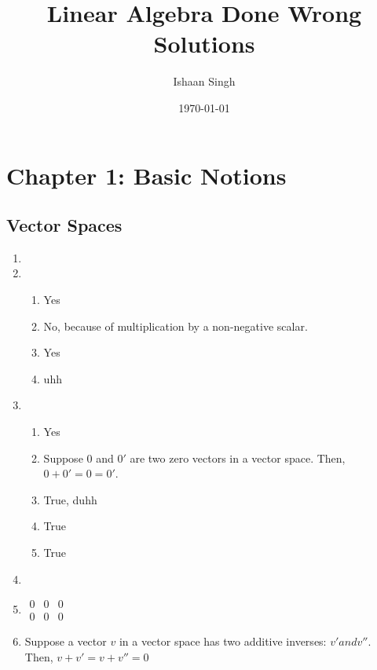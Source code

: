 \documentclass{article}
\title{Linear Algebra Done Wrong\\Solutions}
\author{Ishaan Singh}
\date{\today}
\begin{document}
\maketitle

\section{Chapter 1: Basic Notions}
\subsection{Vector Spaces}

\begin{enumerate}
\item
\item \begin{enumerate}
    \item Yes
    \item No, because of multiplication by a non-negative scalar.
    \item Yes
    \item uhh
\end{enumerate}
\item \begin{enumerate}
    \item Yes
    \item Suppose $0$ and $0'$ are two zero vectors in a vector space. Then,
    $0 + 0' = 0 = 0'$.
    \item True, duhh
    \item True
    \item True
\end{enumerate}
\item
\item $\begin{matrix} 0 & 0 & 0 \\
0 & 0 & 0 \end{matrix}$
\item Suppose a vector $v$ in a vector space has two additive
inverses: $v' and v''$. Then, $v + v' = v + v'' = 0$
\end{enumerate}
\end{document}
